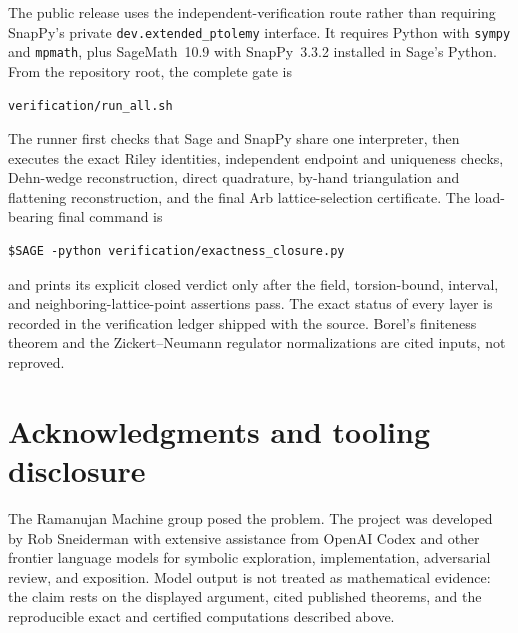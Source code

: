 \documentclass[11pt]{article}
\theoremstyle{definition}
\begin{document}
The public release uses the independent-verification route rather than requiring
SnapPy's private \texttt{dev.extended\_ptolemy} interface.  It requires Python
with \texttt{sympy} and \texttt{mpmath}, plus SageMath~10.9 with SnapPy~3.3.2
installed in Sage's Python.  From the repository root, the complete gate is
\begin{verbatim}
verification/run_all.sh
\end{verbatim}
The runner first checks that Sage and SnapPy share one interpreter, then executes
the exact Riley identities, independent endpoint and uniqueness checks,
Dehn-wedge reconstruction, direct quadrature, by-hand triangulation and
flattening reconstruction, and the final Arb lattice-selection certificate.
The load-bearing final command is
\begin{verbatim}
$SAGE -python verification/exactness_closure.py
\end{verbatim}
and prints its explicit closed verdict only after the field, torsion-bound,
interval, and neighboring-lattice-point assertions pass.  The exact status of
every layer is recorded in the verification ledger shipped with the source.
Borel's finiteness theorem and
the Zickert--Neumann regulator normalizations are cited inputs, not reproved.

\section*{Acknowledgments and tooling disclosure}

The Ramanujan Machine group posed the problem.  The project was developed by
Rob Sneiderman with extensive assistance from OpenAI Codex and other
frontier language models for symbolic exploration, implementation, adversarial
review, and exposition.  Model output is not treated as mathematical evidence:
the claim rests on the displayed argument, cited published theorems, and the
reproducible exact and certified computations described above.
\end{document}
